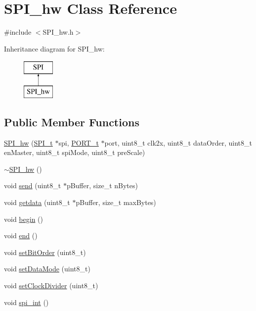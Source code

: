 \hypertarget{class_s_p_i__hw}{
\section{SPI\_\-hw Class Reference}
\label{class_s_p_i__hw}
}


{\ttfamily \#include $<$SPI\_\-hw.h$>$}

Inheritance diagram for SPI\_\-hw:\begin{figure}[H]
\begin{center}
\leavevmode
\includegraphics[height=2.000000cm]{class_s_p_i__hw}
\end{center}
\end{figure}
\subsection*{Public Member Functions}
\begin{DoxyCompactItemize}
\item 
\hyperlink{class_s_p_i__hw_a1364379c3b16c778d90d97ecc932154c}{SPI\_\-hw} (\hyperlink{struct_s_p_i__struct}{SPI\_\-t} $\ast$spi, \hyperlink{struct_p_o_r_t__struct}{PORT\_\-t} $\ast$port, uint8\_\-t clk2x, uint8\_\-t dataOrder, uint8\_\-t enMaster, uint8\_\-t spiMode, uint8\_\-t preScale)
\item 
\hyperlink{class_s_p_i__hw_a9540c3497d006c68031dc164c559482f}{$\sim$SPI\_\-hw} ()
\item 
void \hyperlink{class_s_p_i__hw_ae90647f5555d139cbbf98ac50deb5487}{send} (uint8\_\-t $\ast$pBuffer, size\_\-t nBytes)
\item 
void \hyperlink{class_s_p_i__hw_a5dfc85f3959bb7639985fa53a9688f80}{getdata} (uint8\_\-t $\ast$pBuffer, size\_\-t maxBytes)
\item 
void \hyperlink{class_s_p_i__hw_a1ae87333baec9fd4df321619e7db4c70}{begin} ()
\item 
void \hyperlink{class_s_p_i__hw_a62aaf0047809780b5804cc2acead7d7a}{end} ()
\item 
void \hyperlink{class_s_p_i__hw_ada01136f7847c2d3a27d5a9d37e958c5}{setBitOrder} (uint8\_\-t)
\item 
void \hyperlink{class_s_p_i__hw_ac7ad2285241535b622899ca2c4e4b706}{setDataMode} (uint8\_\-t)
\item 
void \hyperlink{class_s_p_i__hw_a06e4626e6a5e299f384ff73f7849c40e}{setClockDivider} (uint8\_\-t)
\item 
void \hyperlink{class_s_p_i__hw_a4ea05a5ef02a0bfd60bff76208acec74}{spi\_\-int} ()
\end{DoxyCompactItemize}


